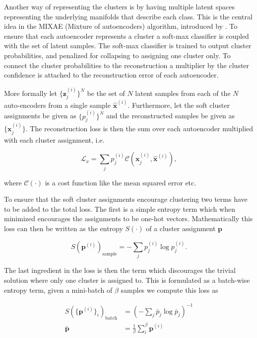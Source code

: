 Another way of representing the clusters is by having multiple latent spaces representing the underlying manifolds that describe each class. This is the central idea in the MIXAE (Mixture of autoencoders) algorithm, introduced by  \cite{Zhang}. To ensure that each autoencoder represents a cluster a soft-max classifier is coupled with the set of latent samples. The soft-max classifier is trained to output cluster probabilities, and penalized for collapsing to assigning one cluster only. To connect the cluster probabilities to the reconstruction a multiplier by the cluster confidence is attached to the reconstruction error of each autoencoder.

More formally let $\{\mathbf{z}_j^{(i)}\}^N$ be the set of $N$ latent samples from each of the $N$ auto-encoders from a single sample $\hat{\mathbf{x}}^{(i)}$. Furthermore, let the soft cluster assignments be given as $\{p_j^{(i)}\}^N$ and the reconstructed samples be given as $\{\mathbf{x}_j^{(i)}\}$. The reconstruction loss is then the sum over each autoencoder multiplied with each cluster assignment, i.e.

\begin{equation}\label{eq:mixae_reconst}
\mathcal{L}_x = \sum_j p_j^{(i)} \mathcal{C}(\mathbf{x}_j^{(i)}, \hat{\mathbf{x}}^{(i)}),
\end{equation}

\noindent where $\mathcal{C}(\cdot)$ is a cost function like the mean squared error etc. 

To ensure that the soft cluster assignments encourage clustering two terms have to be added to the total loss. The first is a simple entropy term which when minimized encourages the assignments to be one-hot vectors. Mathematically this loss can then be written as the entropy $S(\cdot)$ of a cluster assignment $\mathbf{p}$

\begin{equation}\label{eq:mixae_sample}
S(\mathbf{p}^{(i)})_{\text{sample}} = -\sum_j p_j^{(i)} \log p_j^{(i)}. 
\end{equation}

\noindent The last ingredient in the loss is then the term which discourages the trivial solution where only one cluster is assigned to. This is formulated as a batch-wise entropy term, given a mini-batch of $\beta$ samples we compute this loss as 

\begin{equation}\label{eq:mixae_batch}
\begin{split}
S(\{\mathbf{p}^{(i)}\}_i)_{\text{batch}}&= \left(-\sum_j \bar{p}_j \log \bar{p}_j \right)^{-1} \\
\bar{\mathbf{p}} &= \frac{1}{\beta} \sum_i ^\beta \mathbf{p}^{(i)} 
\end{split}
\end{equation}

